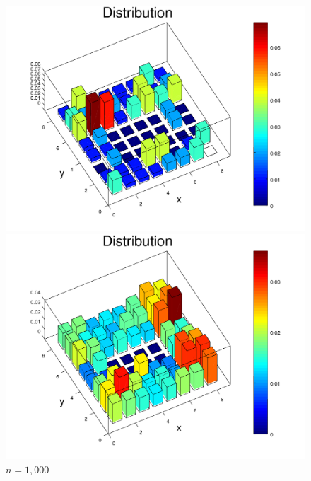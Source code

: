 \documentclass{amsart}
\numberwithin{equation}{section}
\begin{document}
\begin{figure}[!h]
    \centering
   \begin{minipage}{0.50\textwidth}
     \centering
     \includegraphics[width=1.0\linewidth]{figures/withHole/figure_Rook_path_n100.png}
     \captionsetup{labelformat=empty}
     \caption*{$n=100$}
   \end{minipage}\hfil
   \begin{minipage}{0.50\textwidth}
     \centering
     \includegraphics[width=1.0\linewidth]{figures/withHole/figure_Rook_path_n1000.png}
     \captionsetup*{labelformat=empty}
     \caption*{$n=1,000$}
   \end{minipage}\hfil
   \begin{minipage}{0.50\textwidth}

\end{minipage}
\end{figure}
\end{document}
